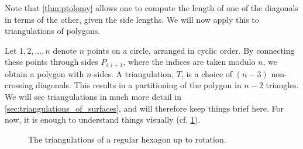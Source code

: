 \begin{example}\label{exmp:triangulations}

	Note that \cref{thm:ptolomy} allows one to compute the length of one of the diagonals
	in terms of the other, given the side lengths. We will now apply this to triangulations
	of polygons.

	Let $1, 2, \dots, n$ denote $n$ points on a circle, arranged in cyclic order. By
	connecting these points through sides $P_{i, i+1}$, where the indices are taken modulo
	$n$, we obtain a polygon with $n$-sides. A triangulation, $T$, is a choice of $(n-3)$ non-crossing diagonals. This results in a
	partitioning of the polygon in $n-2$ triangles. We will see triangulations in much more
	detail in \cref{sec:triangulations_of_surfaces}, and will therefore keep things brief
	here. For now, it is enough to understand things visually (cf.
	\cref{fig:hexagon_triangulations}).
	\begin{figure}[ht]
		\centering

		\caption{The triangulations of a regular hexagon up to rotation.}
		\label{fig:hexagon_triangulations}
	\end{figure}


\end{example}
